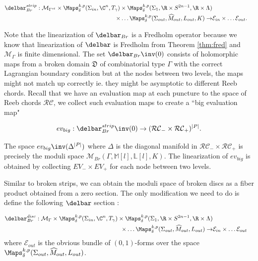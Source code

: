 \begin{align*}
    \delbar^{strip}_{Br} :\mathcal{M}_{\Gamma^{st}}\times \Maps^{k,p}_{\delta}(\Sigma_{in},\C^n,T_\gamma) \times \Maps^{k,p}_{\delta}(\Sigma_1,\R \times S^{2n-1},\R \times \Lambda)\\ \times \dots \Maps^{k,p}_{\delta}(\Sigma_{out},\widehat M_{out},L_{out},K)\to &\mathcal{E}_{in}\times \dots \mathcal{E}_{out}.
\end{align*}



\noindent Note that the linearization of $\delbar_{Br}$ is a Fredholm operator because we know that linearization of $\delbar$ is Fredholm from Theorem \ref{thm:fred} and $\mathcal{M}_\Gamma$ is finite dimensional. The set $\delbar_{Br} \inv (0)$ consists of holomorphic maps from a broken domain $\mathfrak{D}$  of combinatorial type $\Gamma$ with the correct Lagrangian boundary condition but at the nodes between two levels, the maps might not match up correctly ie. they might be asymptotic to different Reeb chords. Recall that we have an evaluation map at each puncture to the space of Reeb chords $\mathcal{RC}$, we collect such evaluation maps to create a ``big evaluation map"

\begin{equation*}
    ev_{big}: {\delbar^{strip}_{Br}}\inv (0) \to ( \mathcal{RC}_- \times \mathcal{RC}_+ )^{|P|}.
\end{equation*}

\noindent The space $ev_{big}\inv (\Delta^{|P|})$ where $\Delta$ is the diagonal manifold in $\mathcal{RC}_- \times \mathcal{RC}_+$ is precisely the moduli space $\mathcal{M}_{Br}(\Gamma,\mathbb{M}[l],\mathbb{L}[l],K)$. The linearization of $ev_{big}$ is obtained by collecting $EV_{-} \times EV_{+}$ for each node between two levels. 

Similar to broken strips, we can obtain the moduli space of broken discs as a fiber product obtained from a zero section. The only modification we need to do is define the following $\delbar$ section :

\begin{align*}
    \delbar^{disc}_{Br} :\mathcal{M}_{\Gamma}\times \Maps^{k,p}_{\delta}(\Sigma_{in},\C^n,T_\gamma) \times \Maps^{k,p}_{\delta}(\Sigma_1,\R \times S^{2n-1},\R \times \Lambda)\\ \times \dots \Maps^{k,p}_{\delta}(\Sigma_{out},\widehat M_{out},L_{out})  \to &\mathcal{E}_{in}\times \dots \mathcal{E}_{out}
\end{align*}
where $\mathcal{E}_{out}$ is the obvious bundle of $(0,1)$-forms over the space $\Maps^{k,p}_{\delta}(\Sigma_{out},\widehat M_{out},L_{out})$.

